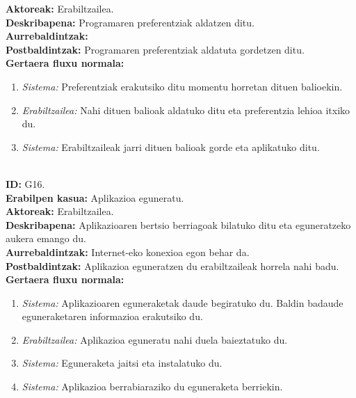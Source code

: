 \textbf{Aktoreak:} Erabiltzailea.\\
\textbf{Deskribapena:} Programaren preferentziak aldatzen ditu.\\
\textbf{Aurrebaldintzak:}\\
\textbf{Postbaldintzak:} Programaren preferentziak aldatuta gordetzen ditu.\\
\textbf{Gertaera fluxu normala:}
\begin{enumerate}
	\item \textit{Sistema:} Preferentziak erakutsiko ditu momentu horretan dituen balioekin.
	\item \textit{Erabiltzailea:} Nahi dituen balioak aldatuko ditu eta preferentzia lehioa itxiko du.
	\item \textit{Sistema:} Erabiltzaileak jarri dituen balioak gorde eta aplikatuko ditu.
\end{enumerate}
\newpage
\noindent\\
\textbf{ID:} G16.\\
\textbf{Erabilpen kasua:} Aplikazioa eguneratu.\\
\textbf{Aktoreak:} Erabiltzailea.\\
\textbf{Deskribapena:} Aplikazioaren bertsio berriagoak bilatuko ditu eta eguneratzeko aukera emango du.\\
\textbf{Aurrebaldintzak:} Internet-eko konexioa egon behar da.\\
\textbf{Postbaldintzak:} Aplikazioa eguneratzen du erabiltzaileak horrela nahi badu.\\
\textbf{Gertaera fluxu normala:}
\begin{enumerate}
	\item \textit{Sistema:} Aplikazioaren eguneraketak daude begiratuko du. Baldin badaude eguneraketaren informazioa erakutsiko du.
	\item \textit{Erabiltzailea:} Aplikazioa eguneratu nahi duela baieztatuko du.
	\item \textit{Sistema:} Eguneraketa jaitsi eta instalatuko du.
	\item \textit{Sistema:} Aplikazioa berrabiaraziko du eguneraketa berriekin.
\end{enumerate}
\newpage
